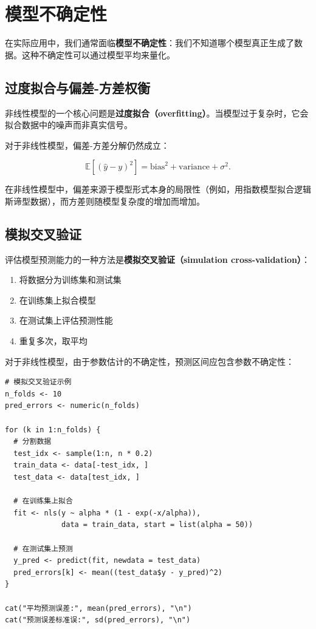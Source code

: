 \section{模型不确定性}\label{sec:model-uncertainty}

在实际应用中，我们通常面临\textbf{模型不确定性}：我们不知道哪个模型真正生成了数据。这种不确定性可以通过模型平均来量化。

\subsection{过度拟合与偏差-方差权衡}

非线性模型的一个核心问题是\textbf{过度拟合（overfitting）}。当模型过于复杂时，它会拟合数据中的噪声而非真实信号。

对于非线性模型，偏差-方差分解仍然成立：

\begin{equation}
\mathbb{E}[( \hat{y} - y )^2] = \text{bias}^2 + \text{variance} + \sigma^2. \label{eq:bias-variance-nonlinear}
\end{equation}

在非线性模型中，偏差来源于模型形式本身的局限性（例如，用指数模型拟合逻辑斯谛型数据），而方差则随模型复杂度的增加而增加。

\subsection{模拟交叉验证}

评估模型预测能力的一种方法是\textbf{模拟交叉验证（simulation cross-validation）}：

\begin{enumerate}
  \item 将数据分为训练集和测试集
  \item 在训练集上拟合模型
  \item 在测试集上评估预测性能
  \item 重复多次，取平均
\end{enumerate}

对于非线性模型，由于参数估计的不确定性，预测区间应包含参数不确定性：

\begin{verbatim}
# 模拟交叉验证示例
n_folds <- 10
pred_errors <- numeric(n_folds)

for (k in 1:n_folds) {
  # 分割数据
  test_idx <- sample(1:n, n * 0.2)
  train_data <- data[-test_idx, ]
  test_data <- data[test_idx, ]

  # 在训练集上拟合
  fit <- nls(y ~ alpha * (1 - exp(-x/alpha)),
             data = train_data, start = list(alpha = 50))

  # 在测试集上预测
  y_pred <- predict(fit, newdata = test_data)
  pred_errors[k] <- mean((test_data$y - y_pred)^2)
}

cat("平均预测误差:", mean(pred_errors), "\n")
cat("预测误差标准误:", sd(pred_errors), "\n")
\end{verbatim}

